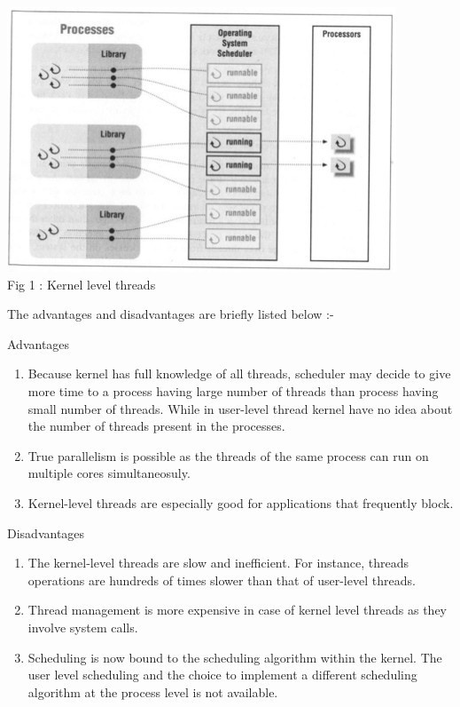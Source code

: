 \documentclass[twoside]{article}
\begin{document}
\begin{center}
  \includegraphics[scale=0.6]{kernel_level_threads.png}\\
  Fig 1 : Kernel level threads
\end{center} 


The advantages and disadvantages are briefly listed below :-

Advantages
\begin{enumerate}
\item Because kernel has full knowledge of all threads, scheduler may decide to give more time to a process having large number of threads than process having small number of threads. While in user-level thread kernel have no idea about the number of threads present in the processes. 
\item True parallelism is possible as the threads of the same process can run on multiple cores simultaneosuly.
\item Kernel-level threads are especially good for applications that frequently block.
\end{enumerate}

Disadvantages
\begin{enumerate}
\item The kernel-level threads are slow and inefficient. For instance, threads operations are hundreds of times slower than that of user-level threads.
\item Thread management is more expensive in case of kernel level threads as they involve system calls.
\item Scheduling is now bound to the scheduling algorithm within the kernel. The user level scheduling and the choice to implement a different scheduling algorithm at the process level is not available.
\end{enumerate}
\end{document}
